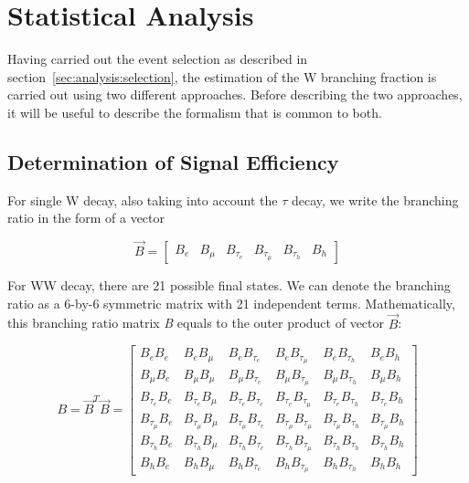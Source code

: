 \section{Statistical Analysis}
\label{sec:analysis:method}



Having carried out the event selection as described in section~\ref{sec:analysis:selection}, the estimation of the W branching fraction is carried out using two different approaches.  Before describing the two approaches, it will be useful to describe the formalism that is common to both.


\subsection{Determination of Signal Efficiency}

For single W decay, also taking into account the $\tau$ decay, we write the branching 
ratio in the form of a vector

\begin{equation}
    \vec{B} = 
    \begin{bmatrix}
        B_e & B_\mu & B_{\tau_e} & B_{\tau_\mu} &  B_{\tau_h} & B_h
	\end{bmatrix} 
\end{equation}

For WW decay, there are 21 possible final states. We can denote the branching
ratio as a 6-by-6 symmetric matrix with 21 independent terms. Mathematically, 
this branching ratio matrix \textit{B} equals to the outer product of vector
$\vec{B}$:

\begin{equation}
	B = \vec{B}^T \vec{B} =
    \begin{bmatrix}
        B_e B_e             & B_e B_\mu         & B_e B_{\tau_e}            & B_e B_{\tau_\mu}          & B_e B_{\tau_h}            & B_e B_h           \\
        B_\mu B_e           & B_\mu B_\mu       & B_\mu B_{\tau_e}          & B_\mu B_{\tau_\mu}        & B_\mu B_{\tau_h}          & B_\mu B_h         \\
        B_{\tau_e} B_e      & B_{\tau_e} B_\mu  & B_{\tau_e} B_{\tau_e}     & B_{\tau_e} B_{\tau_\mu}   & B_{\tau_e} B_{\tau_h}     & B_{\tau_e} B_h    \\
        B_{\tau_\mu} B_e    & B_{\tau_\mu}B_\mu & B_{\tau_\mu} B_{\tau_e}   & B_{\tau_\mu} B_{\tau_\mu} & B_{\tau_\mu} B_{\tau_h}   & B_{\tau_\mu} B_h  \\
        B_{\tau_h} B_e      & B_{\tau_h} B_\mu  & B_{\tau_h} B_{\tau_e}     & B_{\tau_h}  B_{\tau_\mu}  & B_{\tau_h} B_{\tau_h}     & B_{\tau_h} B_h    \\
        B_h B_e             & B_h B_\mu         & B_h B_{\tau_e}            & B_h B_{\tau_\mu}          & B_h  B_{\tau_h}           & B_h  B_h 
	\end{bmatrix}
	\label{eq:br_matrix}
\end{equation}


